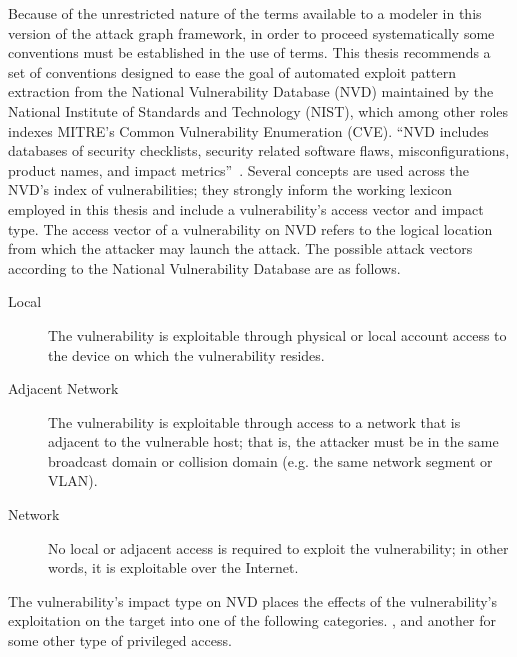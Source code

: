 Because of the unrestricted nature of the terms available to a modeler
in this version of the attack graph framework, in order to proceed systematically
some conventions must be established in the use of terms. This thesis recommends
a set of conventions designed to ease the goal of automated exploit pattern extraction
from the National Vulnerability Database (NVD) maintained by the 
National Institute of Standards and Technology (NIST), which among other roles
indexes MITRE's Common Vulnerability Enumeration (CVE). ``NVD includes 
databases of security checklists, security related software flaws, 
misconfigurations, product names, and impact metrics''~\cite{nvdhome}.
Several concepts are used across the NVD's index of vulnerabilities; they
strongly inform the working lexicon employed in this thesis and include
a vulnerability's access vector and impact type.
The access vector of a vulnerability on NVD refers to the logical location from
which the attacker may launch the attack. The possible attack vectors according
to the National Vulnerability Database are as follows.
\begin{description}
\item[Local] The vulnerability is exploitable through physical or local account access
    to the device on which the vulnerability resides.
\item[Adjacent Network] The vulnerability is exploitable through access to a network
    that is adjacent to the vulnerable host; that is, the attacker must be in the same
    broadcast domain or collision domain (e.g. the same network segment or VLAN).
\item[Network] No local or adjacent access is required to exploit the vulnerability;
    in other words, it is exploitable over the Internet.
\end{description}
The vulnerability's impact type on NVD places the effects of the vulnerability's
exploitation on the target into one of the following categories.
, and another for some other type of privileged access.
